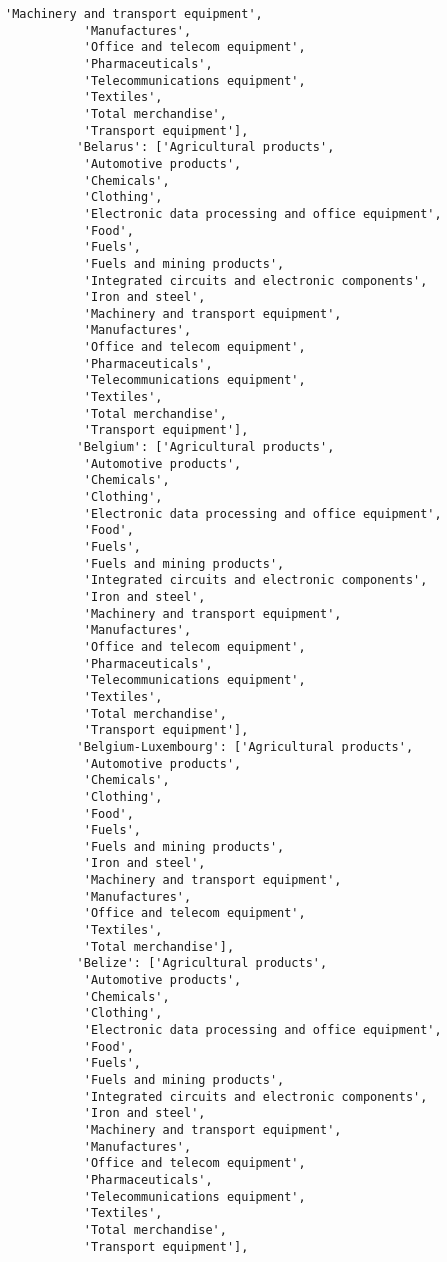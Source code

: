 \documentclass[11pt]{article}
\begin{document}
\begin{Verbatim}[commandchars=\\\{\}]
           'Machinery and transport equipment',
           'Manufactures',
           'Office and telecom equipment',
           'Pharmaceuticals',
           'Telecommunications equipment',
           'Textiles',
           'Total merchandise',
           'Transport equipment'],
          'Belarus': ['Agricultural products',
           'Automotive products',
           'Chemicals',
           'Clothing',
           'Electronic data processing and office equipment',
           'Food',
           'Fuels',
           'Fuels and mining products',
           'Integrated circuits and electronic components',
           'Iron and steel',
           'Machinery and transport equipment',
           'Manufactures',
           'Office and telecom equipment',
           'Pharmaceuticals',
           'Telecommunications equipment',
           'Textiles',
           'Total merchandise',
           'Transport equipment'],
          'Belgium': ['Agricultural products',
           'Automotive products',
           'Chemicals',
           'Clothing',
           'Electronic data processing and office equipment',
           'Food',
           'Fuels',
           'Fuels and mining products',
           'Integrated circuits and electronic components',
           'Iron and steel',
           'Machinery and transport equipment',
           'Manufactures',
           'Office and telecom equipment',
           'Pharmaceuticals',
           'Telecommunications equipment',
           'Textiles',
           'Total merchandise',
           'Transport equipment'],
          'Belgium-Luxembourg': ['Agricultural products',
           'Automotive products',
           'Chemicals',
           'Clothing',
           'Food',
           'Fuels',
           'Fuels and mining products',
           'Iron and steel',
           'Machinery and transport equipment',
           'Manufactures',
           'Office and telecom equipment',
           'Textiles',
           'Total merchandise'],
          'Belize': ['Agricultural products',
           'Automotive products',
           'Chemicals',
           'Clothing',
           'Electronic data processing and office equipment',
           'Food',
           'Fuels',
           'Fuels and mining products',
           'Integrated circuits and electronic components',
           'Iron and steel',
           'Machinery and transport equipment',
           'Manufactures',
           'Office and telecom equipment',
           'Pharmaceuticals',
           'Telecommunications equipment',
           'Textiles',
           'Total merchandise',
           'Transport equipment'],

\end{Verbatim}
\end{document}
